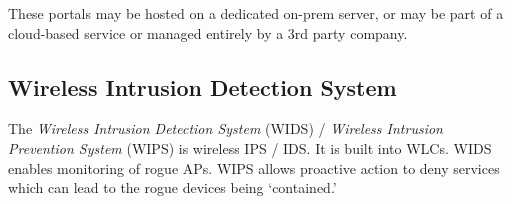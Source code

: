 These portals may be hosted on a dedicated on-prem server, or may be part of a cloud-based service or managed entirely by a 3rd party company. 

\subsection{Wireless Intrusion Detection System}
The \textit{Wireless Intrusion Detection System} (WIDS) / \textit{Wireless Intrusion Prevention System} (WIPS) is wireless IPS / IDS. It is built into WLCs. WIDS enables monitoring of rogue APs. WIPS allows proactive action to deny services which can lead to the rogue devices being `contained.'